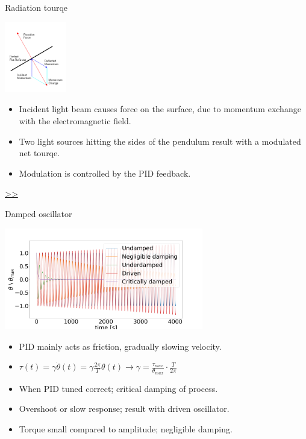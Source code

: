 \documentclass{beamer}
\begin{document}
\begin{frame}{\hypertarget{frame:Radiation tourqe}{Radiation tourqe}}
	\begin{center}		
		\includegraphics[width=0.2\textwidth,keepaspectratio]{radiation.PNG}
    \end{center}

	
	\begin{itemize}		
		
		\item Incident light beam causes force on the surface, due to momentum exchange with the electromagnetic field.
		\item Two light sources hitting the sides of the pendulum result with a modulated net tourqe.
		\item Modulation is controlled by the PID feedback.
		
	\end{itemize}
	\hyperlink{frame:Radiation tourqe 1}{>>} 
\end{frame}
\begin{frame}{Damped oscillator}
	\begin{center}		
		\includegraphics[width=0.65\textwidth,keepaspectratio]{underdamp.png}
	\end{center}
	\begin{itemize}		
		\item PID mainly acts as friction, gradually slowing velocity.
		\item $\tau(t) =  \gamma\dot{\theta}(t) =  \gamma\frac{2\pi}{T} \theta( t) \rightarrow \gamma  =\frac{\tau_{max}}{\theta_{max}}\cdot \frac{ T}{2\pi} $
		\item When PID tuned correct; critical damping of process.
		\item Overshoot or slow response; result with driven oscillator.
		\item Torque small compared to amplitude; negligible damping. 
		
	\end{itemize}
\end{frame}
\end{document}
